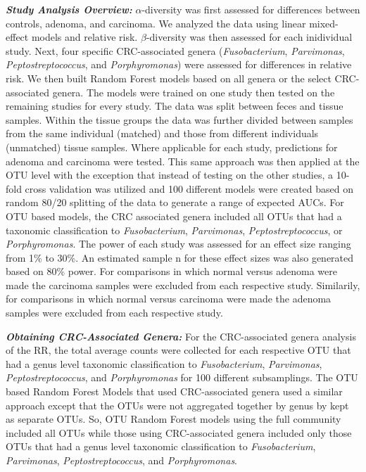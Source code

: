 \documentclass[12pt,]{article}
\begin{document}
\textbf{\emph{Study Analysis Overview:}} \(\alpha\)-diversity was first
assessed for differences between controls, adenoma, and carcinoma. We
analyzed the data using linear mixed-effect models and relative risk.
\(\beta\)-diversity was then assessed for each inidividual study. Next,
four specific CRC-associated genera (\emph{Fusobacterium},
\emph{Parvimonas}, \emph{Peptostreptococcus}, and \emph{Porphyromonas})
were assessed for differences in relative risk. We then built Random
Forest models based on all genera or the select CRC-associated genera.
The models were trained on one study then tested on the remaining
studies for every study. The data was split between feces and tissue
samples. Within the tissue groups the data was further divided between
samples from the same individual (matched) and those from different
individuals (unmatched) tissue samples. Where applicable for each study,
predictions for adenoma and carcinoma were tested. This same approach
was then applied at the OTU level with the exception that instead of
testing on the other studies, a 10-fold cross validation was utilized
and 100 different models were created based on random 80/20 splitting of
the data to generate a range of expected AUCs. For OTU based models, the
CRC associated genera included all OTUs that had a taxonomic
classification to \emph{Fusobacterium}, \emph{Parvimonas},
\emph{Peptostreptococcus}, or \emph{Porphyromonas}. The power of each
study was assessed for an effect size ranging from 1\% to 30\%. An
estimated sample n for these effect sizes was also generated based on
80\% power. For comparisons in which normal versus adenoma were made the
carcinoma samples were excluded from each respective study. Similarily,
for comparisons in which normal versus carcinoma were made the adenoma
samples were excluded from each respective study.

\textbf{\emph{Obtaining CRC-Associated Genera:}} For the CRC-associated
genera analysis of the RR, the total average counts were collected for
each respective OTU that had a genus level taxonomic classification to
\emph{Fusobacterium}, \emph{Parvimonas}, \emph{Peptostreptococcus}, and
\emph{Porphyromonas} for 100 different subsamplings. The OTU based
Random Forest Models that used CRC-associated genera used a similar
approach except that the OTUs were not aggregated together by genus by
kept as separate OTUs. So, OTU Random Forest models using the full
community included all OTUs while those using CRC-associated genera
included only those OTUs that had a genus level taxonomic classification
to \emph{Fusobacterium}, \emph{Parvimonas}, \emph{Peptostreptococcus},
and \emph{Porphyromonas}.
\end{document}
